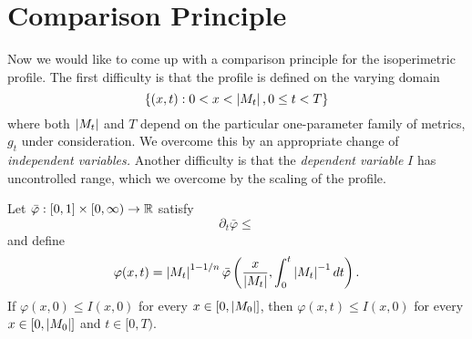 \documentclass{amsart}
\begin{document}
\section{Comparison Principle}
\label{sec:comparison}

Now we would like to come up with a comparison principle for the isoperimetric profile. The first difficulty is that the profile is defined on the varying domain
\[
\{(x, t) : 0 < x < \left|{M_t}\right|, 0 \leq t < T\}
\]
where both \(\left|{M_t}\right|\) and \(T\) depend on the particular one-parameter family of metrics, \(g_t\) under consideration. We overcome this by an appropriate change of \emph{independent variables.} Another difficulty is that the \emph{dependent variable} \(I\) has uncontrolled range, which we overcome by the scaling of the profile.

\begin{thm}
Let \(\bar{\varphi} : [0, 1] \times [0, \infty) \to \mathbb{R}\) satisfy
\[
\partial_t \bar{\varphi} \leq 
\]
and define
\[
\varphi(x, t) = \left|{M_t}\right|^{1-1/n} \bar{\varphi} \left(\frac{x}{\left|{M_t}\right|}, \int_0^t \left|{M_t}\right|^{-1} dt\right).
\]
If \(\varphi(x, 0) \leq I(x, 0)\) for every \(x \in [0, \left|{M_0}\right|]\), then \(\varphi(x, t) \leq I(x, 0)\) for every \(x \in [0, \left|{M_0}\right|]\) and \(t \in [0, T)\).
\end{thm}
\end{document}

